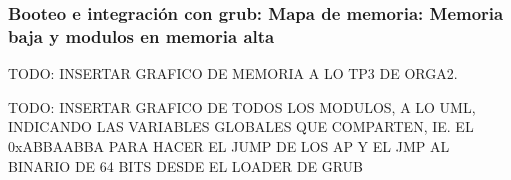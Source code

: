 	
	\subsubsection{Booteo e integración con grub: Mapa de memoria: Memoria baja y modulos en memoria alta}

		TODO: INSERTAR GRAFICO DE MEMORIA A LO TP3 DE ORGA2.

		TODO: INSERTAR GRAFICO DE TODOS LOS MODULOS, A LO UML, INDICANDO LAS VARIABLES GLOBALES QUE COMPARTEN,
		IE. EL 0xABBAABBA PARA HACER EL JUMP DE LOS AP Y EL JMP AL BINARIO DE 64 BITS DESDE EL LOADER DE GRUB
